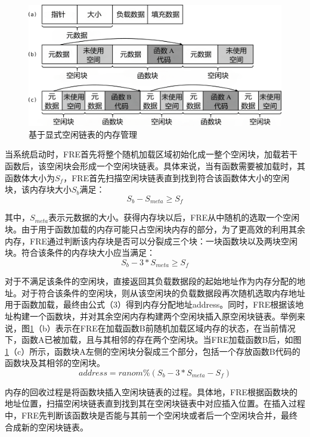 \documentclass[UTF8,12pt,a4paper]{ctexart}
\numberwithin{figure}{section}
\begin{document}
\begin{figure}
    \centering
    \includegraphics[scale=0.23]{graph/memoryManagement.png}
    \caption{基于显式空闲链表的内存管理}
    \label{fig:memoryManagement}
\end{figure}
\par 当系统启动时，FRE首先将整个随机加载区域初始化成一整个空闲块，加载若干函数后，该空闲块会形成一个空闲块链表。具体来说，当有函数需要被加载时，其函数体大小为$S_f$​，FRE首先扫描空闲块链表直到找到符合该函数体大小的空闲块，该内存块大小$S_b$​满足：
\begin{equation}
    S_b-S_{meta}≥S_f \label{1}
\end{equation}
\par 其中，$S_{meta}$表示元数据的大小。获得内存块以后，FRE从中随机的选取一个空闲块。由于用于函数加载的内存可能只占空闲块内存的部分，为了更高效的利用其余内存，FRE通过判断该内存块是否可以分裂成三个块：一块函数块以及两块空闲块。符合该条件的内存块大小应当满足：
\begin{equation}
    S_b-3*S_{meta}≥S_f
\end{equation}
\par 对于不满足该条件的空闲块，直接返回其负载数据段的起始地址作为内存分配的地址。对于符合该条件的空闲块，则从该空闲块的负载数据段再次随机选取内存地址用于函数加载，最终由公式（3）得到内存分配地址address。同时，FRE根据该地址构建一个函数块，并对其余空闲内存构建两个空闲块插入原空闲块链表。举例来说，图\ref{fig:memoryManagement}（b）表示在FRE在加载函数B前随机加载区域内存的状态，在当前情况下，函数A已被加载，且与其相邻的存在两个空闲块。当FRE加载函数B后，如图\ref{fig:memoryManagement}（c）所示，函数块A左侧的空闲块分裂成三个部分，包括一个存放函数B代码的函数块及其相邻的空闲块。
\begin{equation}
    address=ranom\%(S_b-3*S_{meta}-S_f)
\end{equation}
\par 内存的回收过程是将函数块插入空闲块链表的过程。具体地，FRE根据函数块的地址位置，扫描空闲块链表直到找到其在空闲块链表中对应插入位置。在插入过程中，FRE先判断该函数块是否能与其前一个空闲块或者后一个空闲块合并，最终合成新的空闲块链表。
\end{document}
